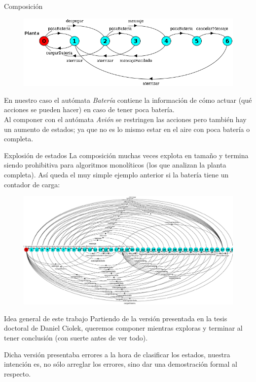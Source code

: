 \begin{frame}{Composición}
    \begin{figure}
     \includegraphics[width=\textwidth]{figures/planta.png}
    \end{figure}
    En nuestro caso el autómata \textit{Batería} contiene la información de cómo actuar (qué acciones se pueden hacer) en caso de tener poca batería.\\ 
    Al componer con el autómata \textit{Avión} se restringen las acciones pero también hay un aumento de estados; ya que no es lo mismo estar en el aire con poca batería o completa.
\end{frame}
\begin{frame}{Explosión de estados}
    La composición muchas veces explota en tamaño y termina siendo prohibitiva para algoritmos monolíticos (los que analizan la planta completa). Así queda el muy simple ejemplo anterior si la batería tiene un contador de carga:
    \begin{figure}
    	\includegraphics[width=\textwidth]{figures/big-plant.png}
    \end{figure}
\end{frame}
\begin{frame}{Idea general de este trabajo}
    Partiendo de la versión presentada en la tesis doctoral de Daniel Ciolek, queremos componer mientras exploras y terminar al tener conclusión (con suerte antes de ver todo).
    
    Dicha versión presentaba errores a la hora de clasificar los estados, nuestra intención es, no sólo arreglar los errores, sino dar una demostración formal al respecto.
    
\end{frame}
